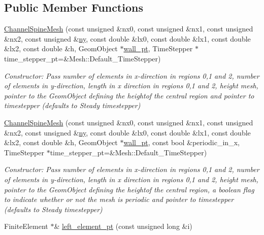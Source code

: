 \subsection*{Public Member Functions}
\begin{DoxyCompactItemize}
\item 
\hyperlink{classoomph_1_1ChannelSpineMesh_a9f8cdd0476807b44bccb7b1ae6f97a4a}{Channel\+Spine\+Mesh} (const unsigned \&nx0, const unsigned \&nx1, const unsigned \&nx2, const unsigned \&\hyperlink{classoomph_1_1RectangularQuadMesh_a86d76a55eb7c4e8bca9b74d23c8b0412}{ny}, const double \&lx0, const double \&lx1, const double \&lx2, const double \&h, Geom\+Object $\ast$\hyperlink{classoomph_1_1ChannelSpineMesh_a741893ef460f1275f1df43496bb7536c}{wall\+\_\+pt}, Time\+Stepper $\ast$time\+\_\+stepper\+\_\+pt=\&Mesh\+::\+Default\+\_\+\+Time\+Stepper)
\begin{DoxyCompactList}\small\item\em Constructor\+: Pass number of elements in x-\/direction in regions 0,1 and 2, number of elements in y-\/direction, length in x direction in regions 0,1 and 2, height mesh, pointer to the Geom\+Object defining the heightof the central region and pointer to timestepper (defaults to Steady timestepper) \end{DoxyCompactList}\item 
\hyperlink{classoomph_1_1ChannelSpineMesh_afb1b729691c03cef065d351094092406}{Channel\+Spine\+Mesh} (const unsigned \&nx0, const unsigned \&nx1, const unsigned \&nx2, const unsigned \&\hyperlink{classoomph_1_1RectangularQuadMesh_a86d76a55eb7c4e8bca9b74d23c8b0412}{ny}, const double \&lx0, const double \&lx1, const double \&lx2, const double \&h, Geom\+Object $\ast$\hyperlink{classoomph_1_1ChannelSpineMesh_a741893ef460f1275f1df43496bb7536c}{wall\+\_\+pt}, const bool \&periodic\+\_\+in\+\_\+x, Time\+Stepper $\ast$time\+\_\+stepper\+\_\+pt=\&Mesh\+::\+Default\+\_\+\+Time\+Stepper)
\begin{DoxyCompactList}\small\item\em Constructor\+: Pass number of elements in x-\/direction in regions 0,1 and 2, number of elements in y-\/direction, length in x direction in regions 0,1 and 2, height mesh, pointer to the Geom\+Object defining the heightof the central region, a boolean flag to indicate whether or not the mesh is periodic and pointer to timestepper (defaults to Steady timestepper) \end{DoxyCompactList}\item 
Finite\+Element $\ast$\& \hyperlink{classoomph_1_1ChannelSpineMesh_a84cbf50caead0aba0170246f4ce7330f}{left\+\_\+element\+\_\+pt} (const unsigned long \&i)

\end{DoxyCompactItemize}
